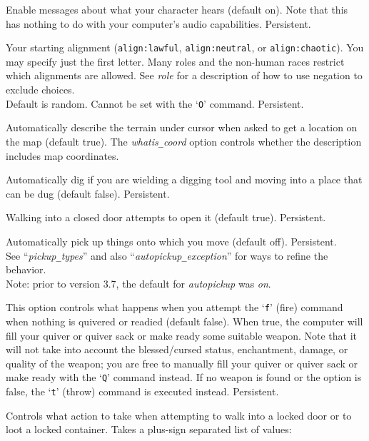 \blist{}
\item[\ib{acoustics}]
Enable messages about what your character hears (default on).
Note that this has nothing to do with your computer's audio capabilities.
Persistent.
\item[\ib{alignment}]
Your starting alignment ({\tt align:lawful}, {\tt align:neutral},
or {\tt align:chaotic}).
You may specify just the first letter.
Many roles and the non-human races restrict which alignments are allowed.
See {\it role\/}
for a description of how to use negation to exclude choices.
\\
Default is random.
Cannot be set with the `{\tt O}' command.  Persistent.
\item[\ib{autodescribe}]
Automatically describe the terrain under cursor when asked to get a location
on the map (default true).
The {\it whatis\verb+_+coord\/}
option controls whether the description includes map coordinates.
\item[\ib{autodig}]
Automatically dig if you are wielding a digging tool and moving into a place
that can be dug (default false).  Persistent.
\item[\ib{autoopen}]
Walking into a closed door attempts to open it (default true).
Persistent.
\item[\ib{autopickup}]
Automatically pick up things onto which you move (default off).
Persistent.
\\
See ``{\it pickup\verb+_+types\/}'' and also
``{\it autopickup\verb+_+exception\/}'' for ways to refine the behavior.
\\
Note: prior to version 3.7, the default for {\it autopickup\/} was {\it on}.
\item[\ib{autoquiver}]
This option controls what happens when you attempt the `{\tt f}' (fire)
command when nothing is quivered or readied (default false).
When true, the computer will fill
your quiver or quiver sack or make ready some suitable weapon.
Note that it will not take
into account the blessed/cursed status, enchantment, damage, or
quality of the weapon; you are free to manually fill your quiver
or quiver sack or make ready
with the `{\tt Q}' command instead.
If no weapon is found or the option is
false, the `{\tt t}' (throw) command is executed instead.  Persistent.
\item[\ib{autounlock}]
Controls what action to take when attempting to walk into a locked door
or to loot a locked container.
Takes a plus-sign separated list of values:
